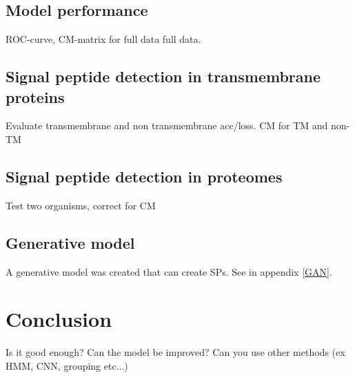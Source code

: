 \subsection{Model performance}
ROC-curve, CM-matrix for full data full data.

\subsection{Signal peptide detection in transmembrane proteins}
Evaluate transmembrane and non transmembrane acc/loss.
CM for TM and non-TM

\subsection{Signal peptide detection in proteomes}
Test two organisms, correct for CM

\subsection{Generative model}
A generative model was created that can create SPs. See in appendix \ref{GAN}.


\section{Conclusion}

Is it good enough? Can the model be improved? Can you use other methods (ex HMM, CNN, grouping etc...)


